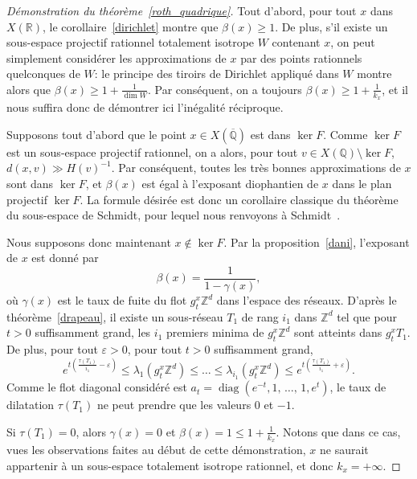 \documentclass[AHL,Unicode,longabstracts,francais,published]{cedram}
\DeclareMathOperator{\diag}{diag}
\newcommand{\R}{\mathbb{R}}
\newcommand{\Z}{\mathbb{Z}}
\newcommand{\Q}{\mathbb{Q}}
\newcommand{\QQ}{\overline{\mathbb{Q}}}
\newcommand{\eps}{\varepsilon}
\begin{document}
\begin{proof}[Démonstration du théorème~\ref{roth_quadrique}]
Tout d'abord, pour tout $x$ dans $X(\R)$, le corollaire~\ref{dirichlet} montre que $\beta(x)\geq 1$. De plus, s'il existe un sous-espace projectif rationnel totalement isotrope $W$ contenant $x$, on peut simplement considérer les approximations de $x$ par des points rationnels quelconques de $W$: le principe des tiroirs de Dirichlet appliqué dans $W$ montre alors que $\beta(x)\geq 1+\frac{1}{\dim W}$. Par conséquent, on a toujours $\beta(x)\geq 1+\frac{1}{k_x}$, et il nous suffira donc de démontrer ici l'inégalité réciproque.

Supposons tout d'abord que le point $x\in X(\QQ)$ est dans $\ker F$. Comme $\ker F$ est un sous-espace projectif rationnel, on a alors, pour tout $v\in X(\Q)\setminus\ker F$, $d(x,v)\gg H(v)^{-1}$. Par conséquent, toutes les très bonnes approximations de $x$ sont dans $\ker F$, et $\beta(x)$ est égal à l'exposant diophantien de $x$ dans le plan projectif $\ker F$. La formule désirée est donc un corollaire classique du théorème du sous-espace de Schmidt, pour lequel nous renvoyons à Schmidt~\cite[Corollary~1C]{schmidt_da}.

Nous supposons donc maintenant $x\not\in\ker F$. Par la proposition~\ref{dani}, l'exposant de $x$ est donné par
\[
\beta(x) = \frac{1}{1-\gamma(x)},
\]
où $\gamma(x)$ est le taux de fuite du flot $g_t^x\Z^d$ dans l'espace des réseaux. D'après le théorème~\ref{drapeau}, il existe un sous-réseau $T_1$ de rang $i_1$ dans $\Z^d$ tel que pour $t>0$ suffisamment grand, les $i_1$ premiers minima de $g_t^x\Z^d$ sont atteints dans $g_t^xT_1$. De plus, pour tout $\eps>0$, pour tout $t>0$ suffisamment grand,
\begin{equation}\label{kfirst}
e^{t\left(\frac{\tau(T_1)}{i_1}-\eps\right)}\leq \lambda_1\left(g_t^x\Z^d\right)\leq\dots\leq \lambda_{i_1}\left(g_t^x\Z^d\right) \leq e^{t\left(\frac{\tau(T_1)}{i_1}+\eps\right)}.
\end{equation}
Comme le flot diagonal considéré est $a_t=\diag(e^{-t},1,\,\dots,\,1,e^t)$, le taux de dilatation $\tau(T_1)$ ne peut prendre que les valeurs $0$ et $-1$.

Si $\tau(T_1)=0$, alors $\gamma(x)=0$ et $\beta(x)=1\leq 1+\frac{1}{k_x}$. Notons que dans ce cas, vues les observations faites au début de cette démonstration, $x$ ne saurait appartenir à un sous-espace totalement isotrope rationnel, et donc $k_x=+\infty$.


\end{proof}
\end{document}
